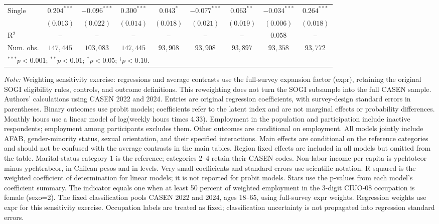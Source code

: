 \begin{table}[htpb]
{\begin{tabular}{l c c c c c c c c}
Single & $0.204^{***}$ & $-0.096^{***}$ & $0.300^{***}$ & $0.043^{*}$ & $-0.077^{***}$ & $0.063^{**}$ & $-0.034^{***}$ & $0.264^{***}$ \\
 & $(0.013)$ & $(0.022)$ & $(0.014)$ & $(0.018)$ & $(0.021)$ & $(0.019)$ & $(0.006)$ & $(0.018)$ \\
\hline
R$^2$ & -- & -- & -- & -- & -- & -- & $0.058$ & -- \\
Num. obs. & $147,445$ & $103,083$ & $147,445$ & $93,908$ & $93,908$ & $93,897$ & $93,358$ & $93,772$ \\
\hline
\multicolumn{9}{l}{\scriptsize $^{***}p<0.001$; $^{**}p<0.01$; $^{*}p<0.05$; $^{\dagger}p<0.10$.} \\
\end{tabular}%
}
\par\smallskip
\begin{minipage}{\textwidth}\footnotesize\raggedright
\textit{Note:} Weighting sensitivity exercise: regressions and average contrasts use the full-survey expansion factor (expr), retaining the original SOGI eligibility rules, controls, and outcome definitions. This reweighting does not turn the SOGI subsample into the full CASEN sample. Authors' calculations using CASEN 2022 and 2024. Entries are original regression coefficients, with survey-design standard errors in parentheses. Binary outcomes use probit models; coefficients refer to the latent index and are not marginal effects or probability differences. Monthly hours use a linear model of log(weekly hours times 4.33). Employment in the population and participation include inactive respondents; employment among participants excludes them. Other outcomes are conditional on employment. All models jointly include AFAB, gender-minority status, sexual orientation, and their specified interactions. Main effects are conditional on the reference categories and should not be confused with the average contrasts in the main tables. Region fixed effects are included in all models but omitted from the table. Marital-status category 1 is the reference; categories 2--4 retain their CASEN codes. Non-labor income per capita is ypchtotcor minus ypchtrabcor, in Chilean pesos and in levels. Very small coefficients and standard errors use scientific notation. R-squared is the weighted coefficient of determination for linear models; it is not reported for probit models. Stars use the p-values from each model's coefficient summary. The indicator equals one when at least 50 percent of weighted employment in the 3-digit CIUO-08 occupation is female (sexo=2). The fixed classification pools CASEN 2022 and 2024, ages 18--65, using full-survey expr weights. Regression weights use expr for this sensitivity exercise. Occupation labels are treated as fixed; classification uncertainty is not propagated into regression standard errors.
\end{minipage}
\end{table}
